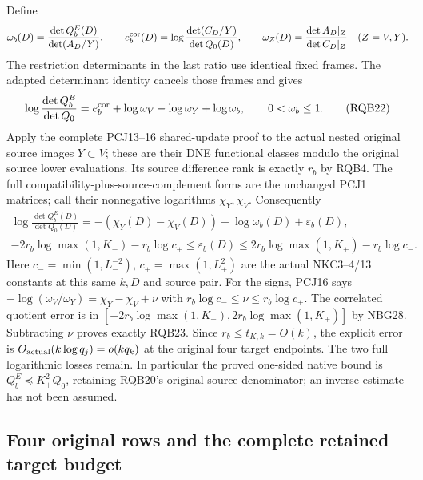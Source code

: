 \documentclass[11pt,a4paper]{article}
\begin{document}
Define
\[
 \omega_b(D)=\frac{\det Q_b^E(D)}{\det(A_D/Y)},\qquad
 e_b^{\rm cor}(D)=\log\frac{\det(C_D/Y)}{\det Q_0(D)},\qquad
 \omega_Z(D)=\frac{\det A_D|_Z}{\det C_D|_Z}\quad(Z=V,Y).
\]
The restriction determinants in the last ratio use identical fixed
frames. The adapted determinant identity cancels those frames and gives
\[
 \log\frac{\det Q_b^E}{\det Q_0}
 =e_b^{\rm cor}+\log\omega_V-\log\omega_Y+\log\omega_b ,
 \qquad 0<\omega_b\le1 .
 \tag{RQB22}
\]
Apply the complete PCJ13--16 shared-update proof to the actual
nested original source images $Y\subset V$; these are their
DNE functional classes modulo the original source lower evaluations.
Its source difference rank is exactly $r_b$ by RQB4.
The full compatibility-plus-source-complement forms are the unchanged
PCJ1 matrices; call their nonnegative logarithms $\chi_Y,\chi_V$.
Consequently
\[
\begin{gathered}
 \log\frac{\det Q_b^E(D)}{\det Q_0(D)}
       =-(\chi_Y(D)-\chi_V(D))+\log\omega_b(D)+\varepsilon_b(D),\\
 -2r_b\log\max(1,K_-)-r_b\log c_+
       \le\varepsilon_b(D)
       \le2r_b\log\max(1,K_+)-r_b\log c_- .
\end{gathered}\tag{RQB23}
\]
Here $c_-=\min(1,L_-^{-2})$, $c_+=\max(1,L_+^2)$ are the
actual NKC3--4/13 constants at this same $k,D$ and source pair.
For the signs, PCJ16 says
$-\log(\omega_V/\omega_Y)=\chi_Y-\chi_V+\nu$ with
$r_b\log c_-\le\nu\le r_b\log c_+$.
The correlated quotient error is in
$[-2r_b\log\max(1,K_-),2r_b\log\max(1,K_+)]$ by NBG28.
Subtracting $\nu$ proves exactly RQB23.
Since $r_b\le t_{K,k}=O(k)$, the explicit error is
$O_{\rm actual}(k\log q_j)=o(kq_k)$ at the original four
target endpoints. The two full logarithmic losses remain.
In particular the proved one-sided native bound is
$Q_b^E\preceq K_+^2Q_0$, retaining RQB20's original source
denominator; an inverse estimate has not been assumed.

\subsection{Four original rows and the complete retained target budget}
\end{document}
